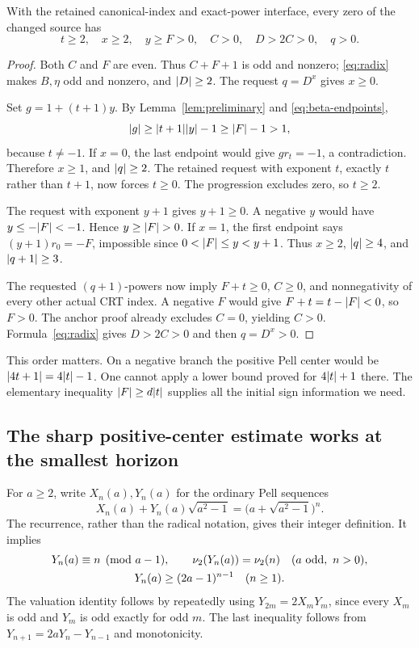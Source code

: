 \begin{lemma}\label{lem:signs}
With the retained canonical-index and exact-power interface, every zero
of the changed source has
\[
 t\ge2,\quad x\ge2,\quad y\ge F>0,\quad C>0,
 \quad D>2C>0,\quad q>0.
\]
\end{lemma}
\begin{proof}
Both \(C\) and \(F\) are even. Thus \(C+F+1\) is odd and nonzero;
\eqref{eq:radix} makes \(B,\eta\) odd and nonzero, and
\(\lvert D\rvert\ge2\). The request \(q=D^x\) gives \(x\ge0\).

Set \(g=1+(t+1)y\). By Lemma~\ref{lem:preliminary} and
\eqref{eq:beta-endpoints},
\[
 \lvert g\rvert\ge\lvert t+1\rvert\lvert y\rvert-1
       \ge\lvert F\rvert-1>1,
\]
because \(t\ne-1\). If \(x=0\), the last endpoint would give
\(gr_t=-1\), a contradiction. Therefore \(x\ge1\), and
\(\lvert q\rvert\ge2\). The retained request with exponent \(t\), exactly
\(t\) rather than \(t+1\), now forces \(t\ge0\). The progression
excludes zero, so \(t\ge2\).

The request with exponent \(y+1\) gives \(y+1\ge0\). A negative \(y\)
would have \(y\le-\lvert F\rvert<-1\). Hence \(y\ge\lvert F\rvert>0\). If \(x=1\),
the first endpoint says \((y+1)r_0=-F\), impossible since
\(0<\lvert F\rvert\le y<y+1\). Thus \(x\ge2\), \(\lvert q\rvert\ge4\), and
\(\lvert q+1\rvert\ge3\).

The requested \((q+1)\)-powers now imply \(F+t\ge0\), \(C\ge0\),
and nonnegativity of every other actual CRT index. A negative \(F\)
would give \(F+t=t-\lvert F\rvert<0\), so \(F>0\). The anchor proof already
excludes \(C=0\), yielding \(C>0\). Formula~\eqref{eq:radix} gives
\(D>2C>0\) and then \(q=D^x>0\).
\end{proof}

This order matters. On a negative branch the positive Pell center would
be \(\lvert 4t+1\rvert=4\lvert t\rvert-1\). One cannot apply a lower bound proved for
\(4\lvert t\rvert+1\) there. The elementary inequality
\(\lvert F\rvert\ge d\lvert t\rvert\) supplies all the initial sign information we need.

\subsection{The sharp positive-center estimate works at the smallest horizon}

For \(a\ge2\), write \(X_n(a),Y_n(a)\) for the ordinary Pell sequences
\[
 X_n(a)+Y_n(a)\sqrt{a^2-1}
       =\bigl(a+\sqrt{a^2-1}\bigr)^n.
\]
The recurrence, rather than the radical notation, gives their integer
definition. It implies
\begin{equation}\label{eq:pellfacts}
 \begin{gathered}
 Y_n(a)\equiv n\pmod{a-1},\qquad
 \nu_2(Y_n(a))=\nu_2(n)\quad(a\text{ odd},\ n>0),\\
 Y_n(a)\ge(2a-1)^{n-1}\quad(n\ge1).
 \end{gathered}
\end{equation}
The valuation identity follows by repeatedly using
\(Y_{2m}=2X_mY_m\), since every \(X_m\) is odd and \(Y_m\) is odd
exactly for odd \(m\). The last inequality follows from
\(Y_{n+1}=2aY_n-Y_{n-1}\) and monotonicity.

